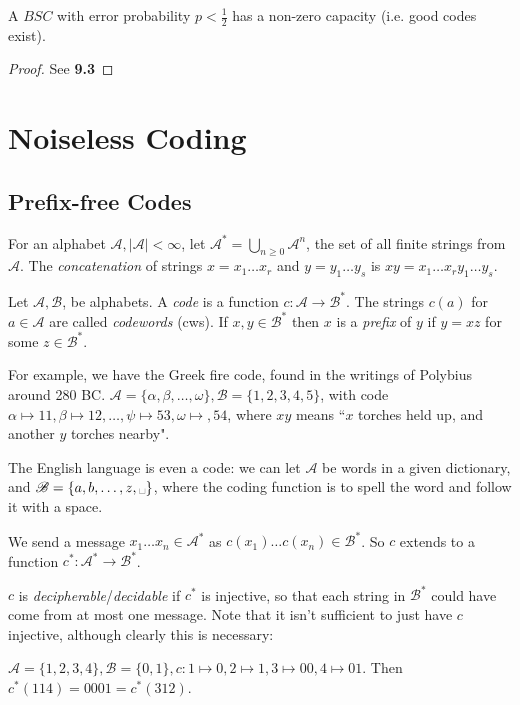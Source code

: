 \documentclass[10pt,a4paper]{article}
\begin{document}
\begin{theorem}
A $BSC$ with error probability $p < \frac12$ has a non-zero capacity (i.e. good codes exist).
\end{theorem}
\begin{proof}
See \textbf{9.3}
\end{proof}

\section{Noiseless Coding}
\subsection{Prefix-free Codes}
For an alphabet $\mathscr{A}, |\mathscr{A}|<\infty$, let $\mathscr{A}^{\ast} = \bigcup_{n\geq 0} \mathscr{A}^n$, the set of all finite strings from $\mathscr{A}$. The \emph{concatenation} of strings $x = x_1\ldots x_r$ and $y = y_1\ldots y_s$ is $xy = x_1\ldots x_ry_1\ldots y_s$.

Let $\mathscr{A}, \mathscr{B}$, be alphabets. A \emph{code} is a function $c:\mathscr{A} \to \mathscr{B}^{\ast}$. The strings $c(a)$ for $a \in \mathscr{A}$ are called \emph{codewords} (cws). If $x, y \in \mathscr{B}^{\ast}$ then $x$ is a \emph{prefix} of $y$ if $y=xz$ for some $z \in \mathscr{B}^{\ast}$.

For example, we have the Greek fire code, found in the writings of Polybius around 280 BC. $\mathscr{A} = \{\alpha, \beta, \ldots, \omega\}, \mathscr{B} = \{1,2,3,4,5\}$, with code $\alpha \mapsto 11, \beta \mapsto 12, \ldots, \psi \mapsto 53, \omega \mapsto, 54$, where $xy$ means ``$x$ torches held up, and another $y$ torches nearby".

The English language is even a code: we can let $\mathscr{A}$ be words in a given dictionary, and $\mathscr{B} = \{a,b,\ldots,z,\text{\textvisiblespace}\}$, where the coding function is to spell the word and follow it with a space.

We send a message $x_1\ldots x_n \in \mathscr{A}^{\ast}$ as $c(x_1)\ldots c(x_n) \in \mathscr{B}^{\ast}$. So $c$ extends to a function $c^{\ast}:\mathscr{A}^{\ast} \to \mathscr{B}^{\ast}$.

$c$ is \emph{decipherable}/\emph{decidable} if $c^{\ast}$ is injective, so that each string in $\mathscr{B}^{\ast}$ could have come from at most one message. Note that it isn't sufficient to just have $c$ injective, although clearly this is necessary:

$\mathscr{A} = \{1,2,3,4\}, \mathscr{B} = \{0,1\}, c:1\mapsto 0, 2\mapsto 1, 3\mapsto 00, 4\mapsto 01$. Then $c^{\ast}(114) = 0001 = c^{\ast}(312)$.
\end{document}
